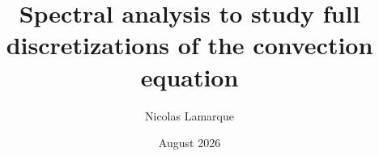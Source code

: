 

\title {Spectral analysis to study full discretizations of the convection equation}

\date {August 2026}

\author{Nicolas Lamarque}




\theoremstyle{plain}
\newtheorem{example}{Example}
\newtheorem{definition}{Definition}

